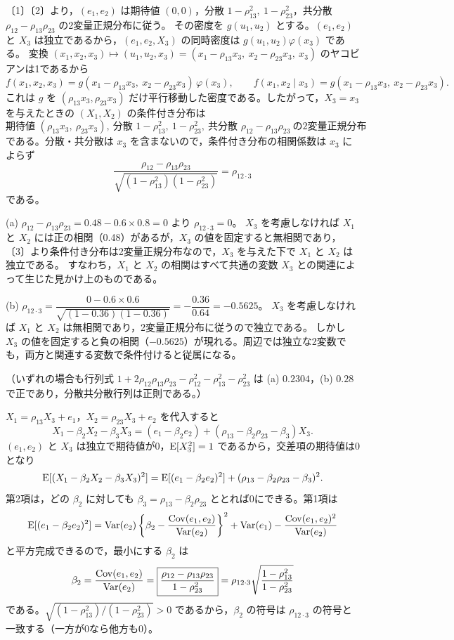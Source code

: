 \documentclass[a4paper,11pt]{ltjsarticle}
\begin{document}
〔1〕〔2〕より，$(e_1,e_2)$ は期待値 $(0,0)$，分散 $1-\rho_{13}^2,\ 1-\rho_{23}^2$，共分散 $\rho_{12}-\rho_{13}\rho_{23}$ の2変量正規分布に従う。
その密度を $g(u_1,u_2)$ とする。$(e_1,e_2)$ と $X_3$ は独立であるから，$(e_1,e_2,X_3)$ の同時密度は $g(u_1,u_2)\varphi(x_3)$ である。
変換 $(x_1,x_2,x_3)\mapsto(u_1,u_2,x_3)=(x_1-\rho_{13}x_3,\ x_2-\rho_{23}x_3,\ x_3)$ のヤコビアンは1であるから
\[
f(x_1,x_2,x_3)=g(x_1-\rho_{13}x_3,\ x_2-\rho_{23}x_3)\,\varphi(x_3),
\qquad
f(x_1,x_2\mid x_3)=g(x_1-\rho_{13}x_3,\ x_2-\rho_{23}x_3).
\]
これは $g$ を $(\rho_{13}x_3,\rho_{23}x_3)$ だけ平行移動した密度である。したがって，$X_3=x_3$ を与えたときの $(X_1,X_2)$ の条件付き分布は
\[
\boxed{\text{期待値 }(\rho_{13}x_3,\ \rho_{23}x_3),\ \text{分散 }1-\rho_{13}^2,\ 1-\rho_{23}^2,\ \text{共分散 }\rho_{12}-\rho_{13}\rho_{23}\ \text{の2変量正規分布}}
\]
である。分散・共分散は $x_3$ を含まないので，条件付き分布の相関係数は $x_3$ によらず
\[
\frac{\rho_{12}-\rho_{13}\rho_{23}}{\sqrt{(1-\rho_{13}^2)(1-\rho_{23}^2)}}=\rho_{12\cdot3}
\]
である。

(a) $\rho_{12}-\rho_{13}\rho_{23}=0.48-0.6\times0.8=0$ より $\boxed{\rho_{12\cdot3}=0}$。
$X_3$ を考慮しなければ $X_1$ と $X_2$ には正の相関（0.48）があるが，$X_3$ の値を固定すると無相関であり，
〔3〕より条件付き分布は2変量正規分布なので，$X_3$ を与えた下で $X_1$ と $X_2$ は独立である。
すなわち，$X_1$ と $X_2$ の相関はすべて共通の変数 $X_3$ との関連によって生じた見かけ上のものである。

(b) $\rho_{12\cdot3}=\dfrac{0-0.6\times0.6}{\sqrt{(1-0.36)(1-0.36)}}=-\dfrac{0.36}{0.64}=\boxed{-0.5625}$。
$X_3$ を考慮しなければ $X_1$ と $X_2$ は無相関であり，2変量正規分布に従うので独立である。
しかし $X_3$ の値を固定すると負の相関（$-0.5625$）が現れる。周辺では独立な2変数でも，両方と関連する変数で条件付けると従属になる。

（いずれの場合も行列式 $1+2\rho_{12}\rho_{13}\rho_{23}-\rho_{12}^2-\rho_{13}^2-\rho_{23}^2$ は (a) $0.2304$，(b) $0.28$ で正であり，分散共分散行列は正則である。）

$X_1=\rho_{13}X_3+e_1$，$X_2=\rho_{23}X_3+e_2$ を代入すると
\[
X_1-\beta_2X_2-\beta_3X_3=(e_1-\beta_2e_2)+(\rho_{13}-\beta_2\rho_{23}-\beta_3)X_3 .
\]
$(e_1,e_2)$ と $X_3$ は独立で期待値が0，$\operatorname{E}[X_3^2]=1$ であるから，交差項の期待値は0となり
\[
\operatorname{E}[(X_1-\beta_2X_2-\beta_3X_3)^2]=\operatorname{E}[(e_1-\beta_2e_2)^2]+(\rho_{13}-\beta_2\rho_{23}-\beta_3)^2 .
\]
第2項は，どの $\beta_2$ に対しても $\beta_3=\rho_{13}-\beta_2\rho_{23}$ ととれば0にできる。第1項は
\[
\operatorname{E}[(e_1-\beta_2e_2)^2]=\operatorname{Var}(e_2)\left\{\beta_2-\frac{\operatorname{Cov}(e_1,e_2)}{\operatorname{Var}(e_2)}\right\}^2+\operatorname{Var}(e_1)-\frac{\operatorname{Cov}(e_1,e_2)^2}{\operatorname{Var}(e_2)}
\]
と平方完成できるので，最小にする $\beta_2$ は
\[
\beta_2=\frac{\operatorname{Cov}(e_1,e_2)}{\operatorname{Var}(e_2)}=\boxed{\frac{\rho_{12}-\rho_{13}\rho_{23}}{1-\rho_{23}^2}}
=\rho_{12\cdot3}\sqrt{\frac{1-\rho_{13}^2}{1-\rho_{23}^2}}
\]
である。$\sqrt{(1-\rho_{13}^2)/(1-\rho_{23}^2)}>0$ であるから，$\beta_2$ の符号は $\rho_{12\cdot3}$ の符号と一致する（一方が0なら他方も0）。
\end{document}
